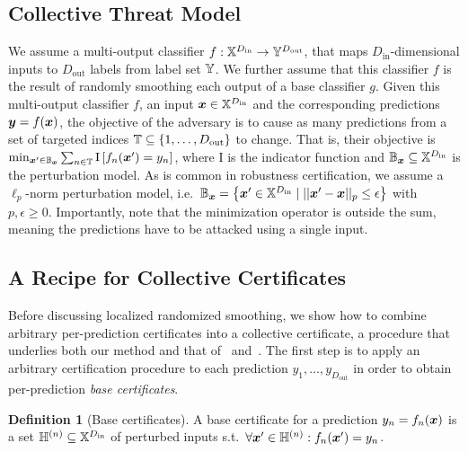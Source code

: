 \documentclass{article} %
\theoremstyle{plain}
\theoremstyle{definition}
\newtheorem{definition}[theorem]{Definition}
\theoremstyle{remark}
\begin{document}
\subsection{Collective Threat Model}\label{section:collective_threat_model}
We assume a multi-output classifier $f : {\mathbb{X}}^{D_\mathrm{in}} \rightarrow {\mathbb{Y}}^{D_\mathrm{out}}$, that maps  $D_\mathrm{in}$-dimensional inputs to $D_\mathrm{out}$ labels from label set ${\mathbb{Y}}$.
We further assume that this classifier $f$ is the result of randomly smoothing each output of a base classifier $g$.
Given this multi-output classifier $f$, an input ${\bm{x}} \in {\mathbb{X}}^{D_\mathrm{in}}$ and the corresponding predictions ${\bm{y}} = f({\bm{x}})$, the objective of the adversary is to cause as many predictions from a set of targeted indices ${\mathbb{T}} \subseteq \{1,\dots,D_\text{out}\}$ to change. That is, their objective is  
$\min_{{\bm{x}}' \in {\mathbb{B}}_{\bm{x}}} \sum_{n \in {\mathbb{T}}} \mathrm{I}\left[f_n({\bm{x}}') = {y}_n \right]$, 
where $\mathrm{I}$ is the indicator function and ${\mathbb{B}}_{\bm{x}} \subseteq {\mathbb{X}}^{D_\mathrm{in}}$ is the perturbation model. As is common in robustness certification, we assume a $\ell_p$-norm perturbation model, i.e.\ ${\mathbb{B}}_{\bm{x}} = \left\{{\bm{x}}' \in {\mathbb{X}}^{D_\mathrm{in}} \mid ||{\bm{x}}' - {\bm{x}}||_p \leq \epsilon \right\}$ with $p, \epsilon \geq 0$.
Importantly, note that the minimization operator is outside the sum, meaning the predictions have to be attacked using a single input.


\subsection{A Recipe for Collective Certificates}\label{section:recipe}
Before discussing localized randomized smoothing,
we show how to combine arbitrary per-prediction certificates
into a collective certificate,
a procedure that underlies both our method and that of~\citet{Schuchardt2021} and~\citet{Fischer2021}. The first step is to apply an arbitrary certification procedure to each prediction $y_1, \dots, y_{D_\mathrm{out}}$
in order to obtain per-prediction \textit{base certificates}.
\begin{definition}[Base certificates]\label{definition:base_certs}
	A base certificate for a prediction ${y}_n = f_n({\bm{x}})$
	is a set ${\mathbb{H}}^{(n)} \subseteq {\mathbb{X}}^{D_\mathrm{in}}$ of perturbed inputs s.t.\ $\forall {\bm{x}}' \in {\mathbb{H}}^{(n)}: f_n({\bm{x}}') = y_n $.
\end{definition}
\end{document}
